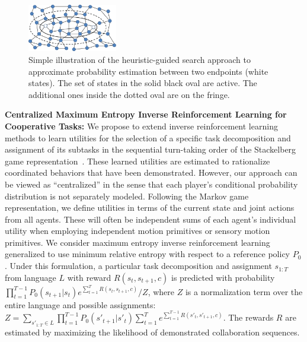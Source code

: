\documentclass[letterpaper, 11 pt, onecolumn]{article}
\begin{document}
\begin{figure}
\includegraphics[width=0.35\textwidth]{fig//softstar.png}
\caption{Simple illustration of the heuristic-guided search approach to approximate probability estimation between two endpoints (white states).  The set of states in the solid black oval are active. The additional ones inside the dotted oval are on the fringe.}
\label{fig:softstar}
\end{figure}
\noindent 
{\bf Centralized Maximum Entropy Inverse Reinforcement Learning for Cooperative Tasks:} We propose to extend inverse reinforcement learning methods \cite{ziebart2008maximum} to learn utilities for the selection of a specific task decomposition and assignment of its subtasks in the sequential turn-taking order of the Stackelberg game representation~\cite{basar1999dynamic}. These learned utilities are estimated to rationalize coordinated behaviors that have been demonstrated.  
However, our approach can be viewed as ``centralized'' in the sense that each player's conditional probability distribution is not separately modeled.
Following the Markov game representation, we define utilities in terms of the current state and joint actions from all agents. These will often be independent sums of each agent's individual utility when employing independent motion primitives or sensory motion primitives. 
We consider maximum entropy inverse reinforcement learning \cite{ziebart2008maximum} generalized to use minimum relative entropy with respect to a reference policy $P_0$.
Under this formulation, a particular task decomposition and assignment $s_{1:T}$  from language $L$ with reward $R(s_t,s_{t+1},c)$ is predicted with probability $\prod_{t=1}^{T-1} P_0(s_{t+1}|s_t) e^{\sum_{t=1}^T R(s_t,s_{t+1},c)}/Z$, where $Z$ is a normalization term over the entire language and possible assignments: $Z = \sum_{s'_{1:T}\in L} \prod_{t=1}^{T-1} P_0(s'_{t+1}|s'_t) \sum_{t=1}^T e^{\sum_{t=1}^{T-1} R(s'_t,s'_{t+1},c)}$. The rewards $R$ are estimated by maximizing the likelihood of demonstrated collaboration sequences.
\end{document}
